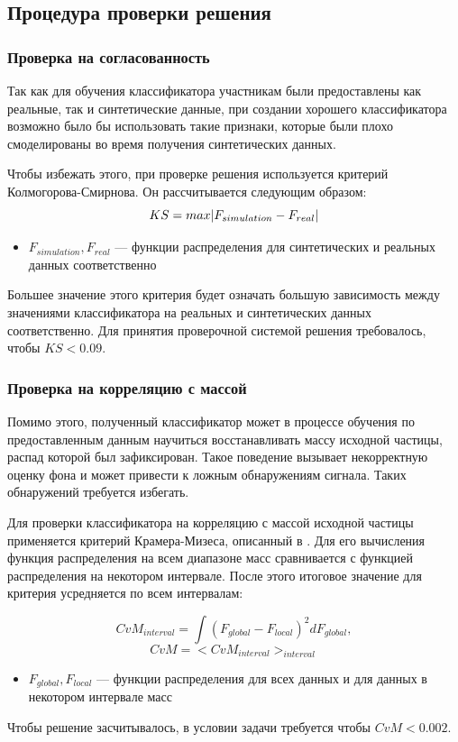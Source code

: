 \documentclass[14pt, a4paper]{extarticle}
\DeclarePairedDelimiter{\abs}{\lvert}{\rvert}
\begin{document}
\subsection{Процедура проверки решения}

\subsubsection{Проверка на согласованность}
\label{agreement_metrics}
Так как для обучения классификатора участникам были предоставлены как реальные, так и синтетические данные, при создании хорошего классификатора возможно было бы использовать такие признаки, которые были плохо смоделированы во время получения синтетических данных. 

Чтобы избежать этого, при проверке решения используется критерий Колмогорова-Смирнова. Он рассчитывается следующим образом:
\begin{equation*}
	KS = max \abs{F_{simulation} - F_{real}}
\end{equation*}
\begin{itemize}
	\item $F_{simulation}, F_{real}$ — функции распределения для синтетических и реальных данных соответственно
\end{itemize}

Большее значение этого критерия будет означать большую зависимость между значениями классификатора на реальных и синтетических данных соответственно.
Для принятия проверочной системой решения требовалось, чтобы $KS < 0.09$.


\subsubsection{Проверка на корреляцию с массой}
\label{mass_metrics}
Помимо этого, полученный классификатор может в процессе обучения по предоставленным данным научиться восстанавливать массу исходной частицы, распад которой был зафиксирован. Такое поведение вызывает некорректную оценку фона и может привести к ложным обнаружениям сигнала. Таких обнаружений требуется избегать.

Для проверки классификатора на корреляцию с массой исходной частицы применяется критерий Крамера-Мизеса, описанный в \cite{cramer}. Для его вычисления функция распределения на всем диапазоне масс сравнивается с функцией распределения на некотором интервале. После этого итоговое значение для критерия усредняется по всем интервалам:

\begin{equation*}
	CvM_{interval} = \int (F_{global} - F_{local})^2 dF_{global},
\end{equation*}
\begin{equation*}
	CvM = <CvM_{interval}>_{interval}
\end{equation*}
\begin{itemize}
	\item $F_{global}, F_{local}$ — функции распределения для всех данных и для данных в некотором интервале масс
\end{itemize}
Чтобы решение засчитывалось, в условии задачи требуется чтобы $CvM < 0.002$.
\end{document}
